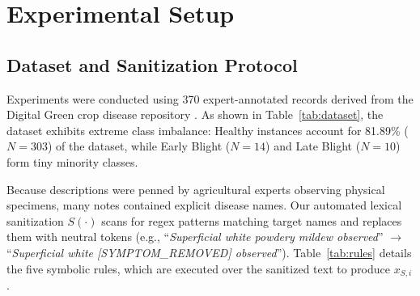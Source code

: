 \documentclass[conference]{IEEEtran}
\begin{document}
\begin{table}[t]
\caption{Predefined Symbolic Symptom Extraction Rules}
\label{tab:rules}
\centering
{}
\end{table}

\section{Experimental Setup}

\subsection{Dataset and Sanitization Protocol}
Experiments were conducted using 370 expert-annotated records derived from the Digital Green crop disease repository \cite{digitalgreen2026}. As shown in Table~\ref{tab:dataset}, the dataset exhibits extreme class imbalance: Healthy instances account for 81.89\% ($N=303$) of the dataset, while Early Blight ($N=14$) and Late Blight ($N=10$) form tiny minority classes. 

Because descriptions were penned by agricultural experts observing physical specimens, many notes contained explicit disease names. Our automated lexical sanitization $S(\cdot)$ scans for regex patterns matching target names and replaces them with neutral tokens (e.g., ``\textit{Superficial white powdery mildew observed}'' $\rightarrow$ ``\textit{Superficial white [SYMPTOM\_REMOVED] observed}''). Table~\ref{tab:rules} details the five symbolic rules, which are executed over the sanitized text to produce $x_{S,i}$.
\end{document}
